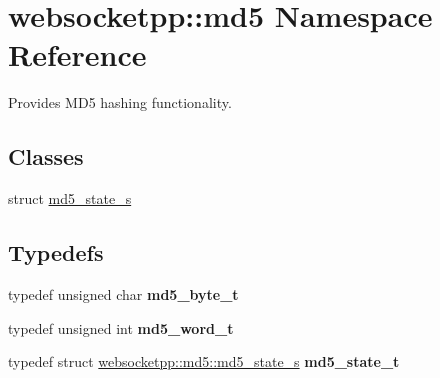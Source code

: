 \hypertarget{namespacewebsocketpp_1_1md5}{}\section{websocketpp\+:\+:md5 Namespace Reference}
\label{namespacewebsocketpp_1_1md5}


Provides M\+D5 hashing functionality.  


\subsection*{Classes}
\begin{DoxyCompactItemize}
\item 
struct \hyperlink{structwebsocketpp_1_1md5_1_1md5__state__s}{md5\+\_\+state\+\_\+s}
\end{DoxyCompactItemize}
\subsection*{Typedefs}
\begin{DoxyCompactItemize}
\item 
typedef unsigned char {\bfseries md5\+\_\+byte\+\_\+t}\hypertarget{namespacewebsocketpp_1_1md5_a0c434041715d244182207c3413e36e71}{}\label{namespacewebsocketpp_1_1md5_a0c434041715d244182207c3413e36e71}

\item 
typedef unsigned int {\bfseries md5\+\_\+word\+\_\+t}\hypertarget{namespacewebsocketpp_1_1md5_a0ece422ac11bb1332dcf342ced42ac96}{}\label{namespacewebsocketpp_1_1md5_a0ece422ac11bb1332dcf342ced42ac96}

\item 
typedef struct \hyperlink{structwebsocketpp_1_1md5_1_1md5__state__s}{websocketpp\+::md5\+::md5\+\_\+state\+\_\+s} {\bfseries md5\+\_\+state\+\_\+t}\hypertarget{namespacewebsocketpp_1_1md5_a4be84c20ee3f9d9c76d4e2f7befe2eff}{}\label{namespacewebsocketpp_1_1md5_a4be84c20ee3f9d9c76d4e2f7befe2eff}

\end{DoxyCompactItemize}
